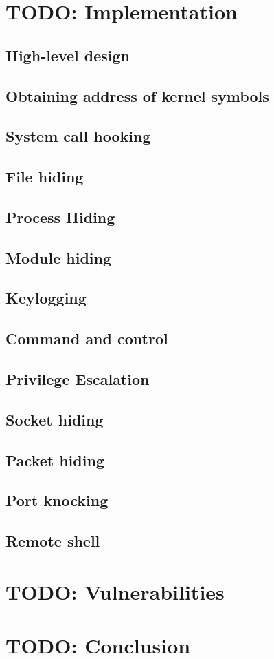 \documentclass[10pt, letterpaper]{scrartcl}
\begin{document}
\section{TODO: Implementation}\label{sec:implementation}

\subsection{High-level design}
\subsection{Obtaining address of kernel symbols}
\subsection{System call hooking}\label{sec:implementation_system_call_hooking}
\subsection{File hiding}
\subsection{Process Hiding}
\subsection{Module hiding}
\subsection{Keylogging}
\subsection{Command and control}
\subsection{Privilege Escalation}
\subsection{Socket hiding}
\subsection{Packet hiding}
\subsection{Port knocking}
\subsection{Remote shell}

\section{TODO: Vulnerabilities}\label{sec:vulnerabilities}
\section{TODO: Conclusion}
\end{document}

